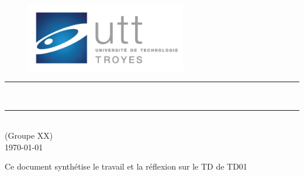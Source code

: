 \thispagestyle{empty} 
\setcounter{page}{0}

\begin{figure}[H]
\centering
\includegraphics[width=7cm]{Ressources-graphiques/logos/logo_UTT.png}
\end{figure}

\vspace{3cm}

\begin{center}

{\color{bleuCielUTT}\rule{\linewidth}{0.8mm}}
\vspace*{0mm}

\Huge{\textbf{\theUE \\ \thetitle}}
{\color{bleuCielUTT}\rule{\linewidth}{0.8mm}}

\vspace{0.5cm}
\Large{\theauthor} \\
\small{(Groupe XX)}\\
\Large{\today}
\end{center}
 
\vspace{3cm}

\begin{myabstract}
Ce document synthétise le travail et la réflexion sur le TD de TD01
\end{myabstract}

\clearpage
